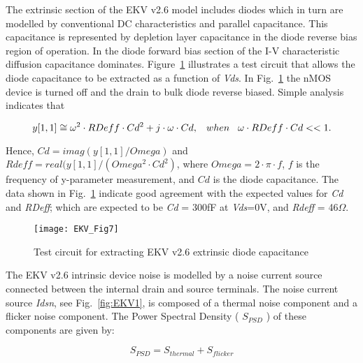 
The extrinsic section of the EKV v2.6 model includes diodes which in
turn are modelled by conventional DC characteristics and parallel
capacitance.  This capacitance is represented by depletion layer
capacitance in the diode reverse bias region of operation.  In the
diode forward bias section of the I-V characteristic diffusion
capacitance dominates. Figure~\ref{fig:EKV7} illustrates a test
circuit that allows the diode capacitance to be extracted as a
function of \textit{Vds}. In Fig.~\ref{fig:EKV7} the nMOS device is
turned off and the drain to bulk diode reverse biased. Simple analysis
indicates that

\hspace{20mm}     \begin{equation} 
			y[1,1] \cong \omega^{2} \cdot RDeff \cdot Cd^{2} + j \cdot \omega \cdot Cd, \hspace{3mm} when \hspace{3mm} \omega \cdot RDeff \cdot Cd << 1.
                  \end{equation}  

Hence, $ Cd = imag( y[1,1]/ Omega)$ and $Rdeff = real( y[1,1]/(
Omega^{2} \cdot Cd^{2})$, where $Omega = 2 \cdot \pi \cdot f$, $f$ is
the frequency of y-parameter measurement, and $Cd$ is the diode
capacitance. The data shown in Fig.~\ref{fig:EKV7} indicate good
agreement with the expected values for \textit{Cd} and \textit{RDeff};
which are expected to be \textit{Cd} = 300fF at \textit{Vds}=0V, and
\textit{Rdeff} = 46$\Omega$.
 
\begin{figure}
  \centering
  \texttt{[image: EKV\_Fig7]}
  \caption{Test circuit for extracting EKV v2.6 extrinsic diode capacitance}
  \label{fig:EKV7}
\end{figure}  


The EKV v2.6 intrinsic device noise is modelled by a noise current source connected between the internal drain and source terminals. The noise current source \textit{Idsn}, see Fig.~\ref{fig:EKV1}, is composed of a thermal noise component and a flicker noise component. The Power Spectral Density ( $S_{PSD}$ ) of these components are given by:  

\hspace{20mm}     \begin{equation} 
			S_{PSD} = S_{thermal} + S_{flicker}
                  \end{equation}  

